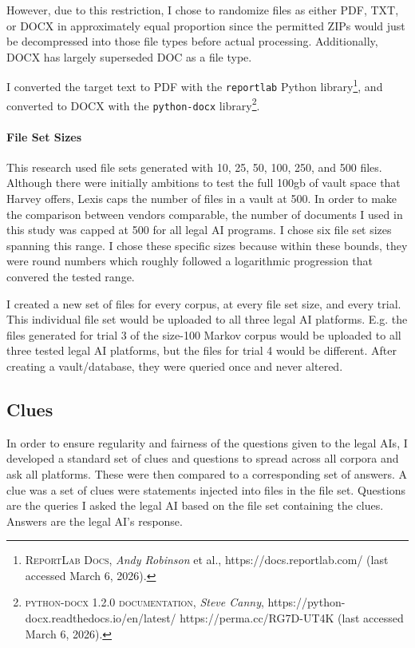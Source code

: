 \documentclass[
]{article}
\begin{document}
However, due to this restriction, I chose to randomize files as either
PDF, TXT, or DOCX in approximately equal proportion since the permitted
ZIPs would just be decompressed into those file types before actual
processing. Additionally, DOCX has largely superseded DOC as a file
type.

I converted the target text to PDF with the \texttt{reportlab} Python
library\footnote{\textsc{ReportLab Docs}, \emph{Andy Robinson} et al.,
  https://docs.reportlab.com/ (last accessed March 6, 2026).}, and
converted to DOCX with the \texttt{python-docx} library\footnote{\textsc{python-docx
  1.2.0 documentation}, \emph{Steve Canny},
  https://python-docx.readthedocs.io/en/latest/
  https://perma.cc/RG7D-UT4K (last accessed March 6, 2026).}.

\paragraph{File Set Sizes}\label{file-set-sizes}

This research used file sets generated with 10, 25, 50, 100, 250, and
500 files. Although there were initially ambitions to test the full
100gb of vault space that Harvey offers, Lexis caps the number of files
in a vault at 500. In order to make the comparison between vendors
comparable, the number of documents I used in this study was capped at
500 for all legal AI programs. I chose six file set sizes spanning this
range. I chose these specific sizes because within these bounds, they
were round numbers which roughly followed a logarithmic progression that
convered the tested range.

I created a new set of files for every corpus, at every file set size,
and every trial. This individual file set would be uploaded to all three
legal AI platforms. E.g. the files generated for trial 3 of the size-100
Markov corpus would be uploaded to all three tested legal AI platforms,
but the files for trial 4 would be different. After creating a
vault/database, they were queried once and never altered.

\subsection{Clues}\label{clues}

In order to ensure regularity and fairness of the questions given to the
legal AIs, I developed a standard set of clues and questions to spread
across all corpora and ask all platforms. These were then compared to a
corresponding set of answers. A clue was a set of clues were statements
injected into files in the file set. Questions are the queries I asked
the legal AI based on the file set containing the clues. Answers are the
legal AI's response.
\end{document}
